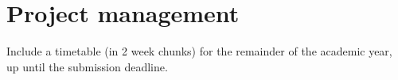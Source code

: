 \section{Project management}

Include a timetable (in 2 week chunks) for the remainder of the academic year, up until the submission deadline.